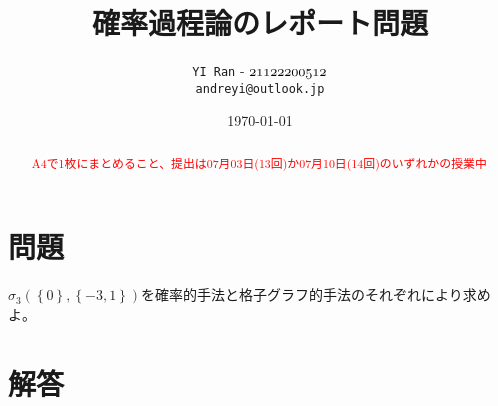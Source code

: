 \documentclass[dvipdfmx]{jsarticle} %
\title{\vspace{-4cm}確率過程論のレポート問題}
\author{\texttt{YI\ Ran} - $\mathnormal{21122200512}$\\ \texttt{andreyi@outlook.jp}}
\date{\today}
\begin{document}
\maketitle


\begin{abstract}
  \textcolor{red}{A4で1枚にまとめること、提出は07月03日(13回)か07月10日(14回)のいずれかの授業中}  
\end{abstract}
\section*{問題}
$ \sigma_3 \left(\left\{0\right\}, \left\{-3,1\right\}\right) $を確率的手法と格子グラフ的手法のそれぞれにより求めよ。
\vspace{-0.4cm}
\section*{解答}
\end{document}
